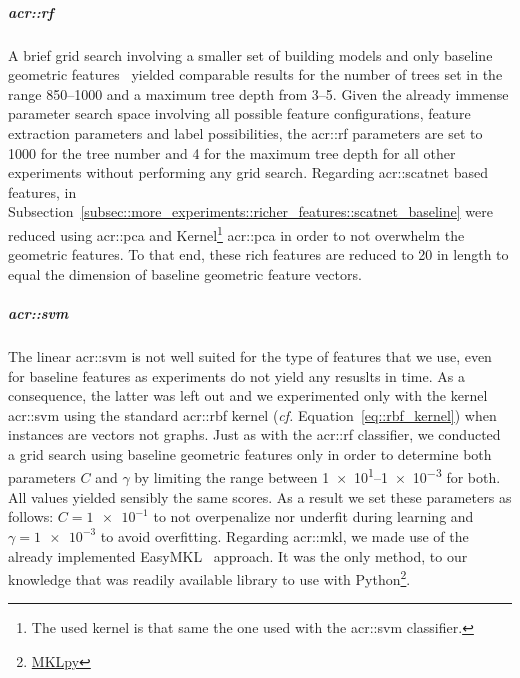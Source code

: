                 \subparagraph{\acrshort*{acr::rf}}
                    A brief grid search involving a smaller set of building models and only baseline geometric features~\parencite{ennafii2018qualificationunannotated} yielded comparable results for the number of trees set in the range \numrange{850}{1000} and a maximum tree depth from \numrange{3}{5}.
                    Given the already immense parameter search space involving all possible feature configurations, feature extraction parameters and label possibilities, the \gls{acr::rf} parameters are set to \num{1000} for the tree number and 4 for the maximum tree depth for all other experiments without performing any grid search.
                    Regarding \gls{acr::scatnet} based features, in Subsection~\ref{subsec::more_experiments::richer_features::scatnet_baseline} were reduced using \gls{acr::pca} and Kernel\footnote{The used kernel is that same the one used with the \gls{acr::svm} classifier.} \gls{acr::pca} in order to not overwhelm the geometric features.
                    To that end, these rich features are reduced to 20 in length to equal the dimension of baseline geometric feature vectors.

                \subparagraph{\acrshort*{acr::svm}}
                    The linear \gls{acr::svm} is not well suited for the type of features that we use, even for baseline features as experiments do not yield any resuslts in time.
                    As a consequence, the latter was left out and we experimented only with the kernel \gls{acr::svm} using the standard \gls{acr::rbf} kernel (\textit{cf.} Equation~\ref{eq::rbf_kernel}) when instances are vectors not graphs.
                    Just as with the \gls{acr::rf} classifier, we conducted a grid search using baseline geometric features only in order to determine both parameters \(C\) and \(\gamma\) by limiting the range between \numrange[range-phrase={ and }]{1e1}{1e-3} for both.
                    All values yielded sensibly the same scores.
                    As a result we set these parameters as follows: \(C = \num{1e-1}\) to not overpenalize nor underfit during learning and \(\gamma = \num{1e-3}\) to avoid overfitting.
                    Regarding \gls{acr::mkl}, we made use of the already implemented EasyMKL~\parencite{aiolli2015easymkl} approach.
                    It was the only method, to our knowledge that was readily available library to use with Python\footnote{\href{https://github.com/IvanoLauriola/MKLpy}{MKLpy}}.
    
